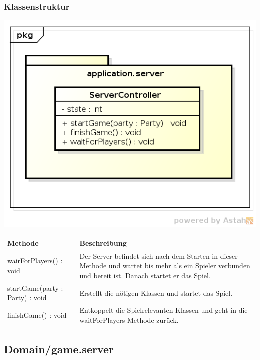 \documentclass[11pt]{scrartcl}
\begin{document}
\subsubsection{Klassenstruktur}
\includegraphics[scale=0.75]{ClassDiagramApplicationServer}

\begin{tabularx}{\linewidth}{l p{9cm}}
\textbf{Methode} & \textbf{Beschreibung}\\
\hline
wairForPlayers() : void & Der Server befindet sich nach dem Starten in dieser Methode und wartet bis mehr als ein Spieler verbunden und bereit ist. Danach startet er das Spiel.\\
startGame(party : Party) : void & Erstellt die nötigen Klassen und startet das Spiel.\\
finishGame() : void & Entkoppelt die Spielrelevanten Klassen und geht in die waitForPlayers Methode zurück.\\
\end{tabularx}

\newpage

\subsection{Domain/game.server}
\end{document}
